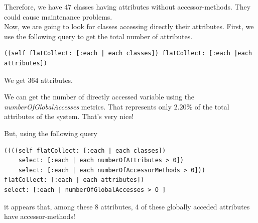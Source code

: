 \documentclass[11pt,a4paper]{article}
\begin{document}
Therefore, we have 47 classes having attributes without accessor-methods. They could cause maintenance problems.\\

Now, we are going to look for classes accessing directly their attributes. First, we use the following query to get the total number of attributes.
\begin{lstlisting}
((self flatCollect: [:each | each classes]) flatCollect: [:each |each attributes])
\end{lstlisting}
We get 364 attributes.

We can get the number of directly accessed variable using the \textit{numberOfGlobalAccesses} metrics. That represents only $2.20\%$ of the total attributes of the system. That's very nice!

But, using the following query\\
\begin{lstlisting}
((((self flatCollect: [:each | each classes])
	select: [:each | each numberOfAttributes > 0])
	select: [:each | each numberOfAccessorMethods > 0]))
flatCollect: [:each | each attributes])
select: [:each | numberOfGlobalAccesses > O ]
\end{lstlisting}
it appears that, among these 8 attributes, 4 of these globally acceded attributes have accessor-methods!\\
\end{document}
